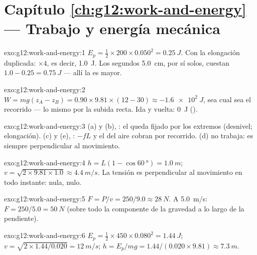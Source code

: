 \section*{Capítulo \ref{ch:g12:work-and-energy} --- Trabajo y energía mecánica}

\begin{solution}{exo:g12:work-and-energy:1}
$E_p = \tfrac12 \times 200 \times 0.050^2 = \qty{0.25}{J}$. Con la
elongación duplicada: $\times 4$, es decir, \qty{1.0}{J}. Los segundos
\qty{5.0}{cm}, por sí solos, cuestan $1.0 - 0.25 = \qty{0.75}{J}$ ---
allí la  es mayor.
\end{solution}

\begin{solution}{exo:g12:work-and-energy:2}
$W = mg(z_A - z_B) = 0.90 \times 9.81 \times (12 - 30) \approx
\qty{-1.6e2}{J}$, sea cual sea el recorrido --- lo mismo por la subida
recta. Ida y vuelta: \qty{0}{J} ().
\end{solution}

\begin{solution}{exo:g12:work-and-energy:3}
(a) y (b), : el  queda fijado por los extremos
(desnivel; elongación). (c) y (e), : $-fL$ y el
 del aire cobran por  recorrido. (d) no trabaja: es
siempre perpendicular al movimiento.
\end{solution}

\begin{solution}{exo:g12:work-and-energy:4}
$h = L(1 - \cos\qty{60}{\degree}) = \qty{1.0}{m}$;
$v = \sqrt{2 \times 9.81 \times 1.0} \approx \qty{4.4}{m/s}$. La tensión
es perpendicular al movimiento en todo instante:  nula, 
nulo.
\end{solution}

\begin{solution}{exo:g12:work-and-energy:5}
$F = P/v = 250/9.0 \approx \qty{28}{N}$. A \qty{5.0}{m/s}:
$F = 250/5.0 = \qty{50}{N}$ (sobre todo la componente de la gravedad a
lo largo de la pendiente).
\end{solution}

\begin{solution}{exo:g12:work-and-energy:6}
$E_p = \tfrac12 \times 450 \times 0.080^2 = \qty{1.44}{J}$;
$v = \sqrt{2 \times 1.44/0.020} = \qty{12}{m/s}$;
$h = E_p/mg = 1.44/(0.020 \times 9.81) \approx \qty{7.3}{m}$.
\end{solution}

